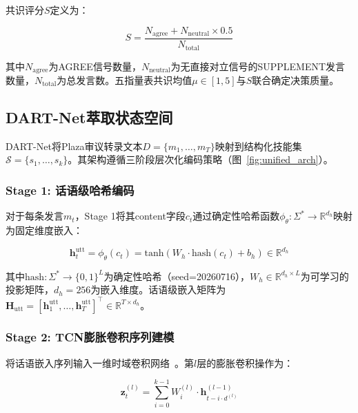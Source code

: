 \documentclass[twocolumn,10.5pt]{ctexart}
\def\R{\mathbb{R}}
\begin{document}
共识评分$S$定义为：

\begin{equation}
S = \frac{N_{\mathrm{agree}} + N_{\mathrm{neutral}} \times 0.5}{N_{\mathrm{total}}}
\label{eq:consensus}
\end{equation}

其中$N_{\mathrm{agree}}$为AGREE信号数量，$N_{\mathrm{neutral}}$为无直接对立信号的SUPPLEMENT发言数量，$N_{\mathrm{total}}$为总发言数。五指量表共识均值$\mu \in [1,5]$与$S$联合确定决策质量。

\subsection{DART-Net萃取状态空间}

DART-Net将Plaza审议转录文本$D = \{m_1, \ldots, m_T\}$映射到结构化技能集$\mathcal{S} = \{s_1, \ldots, s_k\}$。其架构遵循三阶段层次化编码策略（图~\ref{fig:unified_arch}）。

\subsubsection{Stage 1: 话语级哈希编码}

对于每条发言$m_t$，Stage 1将其content字段$c_t$通过确定性哈希函数$\phi_\theta: \Sigma^* \to \R^{d_h}$映射为固定维度嵌入：

\begin{equation}
\mathbf{h}_t^{\text{utt}} = \phi_\theta(c_t) = \mathrm{tanh}(W_h \cdot \mathrm{hash}(c_t) + b_h) \in \R^{d_h}
\label{eq:hash_enc}
\end{equation}

其中$\mathrm{hash}: \Sigma^* \to \{0,1\}^L$为确定性哈希（seed=20260716），$W_h \in \R^{d_h \times L}$为可学习的投影矩阵，$d_h = 256$为嵌入维度。话语级嵌入矩阵为$\mathbf{H}_{\text{utt}} = [\mathbf{h}_1^{\text{utt}}, \ldots, \mathbf{h}_T^{\text{utt}}]^\top \in \R^{T \times d_h}$。

\subsubsection{Stage 2: TCN膨胀卷积序列建模}

将话语嵌入序列输入一维时域卷积网络~\cite{bai2018tcn}。第$l$层的膨胀卷积操作为：

\begin{equation}
\mathbf{z}^{(l)}_t = \sum_{i=0}^{k-1} W^{(l)}_i \cdot \mathbf{h}^{(l-1)}_{t - i \cdot d^{(l)}}
\label{eq:tcn}
\end{equation}
\end{document}
